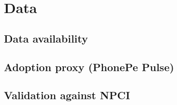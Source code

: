 \chapter{Data}\label{ch:data}

\section{Data availability}

\section{Adoption proxy (PhonePe Pulse)}

\section{Validation against NPCI}
\begin{table}[tbp]
\centering\small

\caption{Correlation between PhonePe Pulse and NPCI state data, by quarter, 2025Q2--2026Q2 (35 units per quarter; Pearson and Spearman coefficients of state shares of the national count and value). Data: PhonePe Pulse; NPCI UPI statistics.}
\label{tab:validation}
\end{table}

